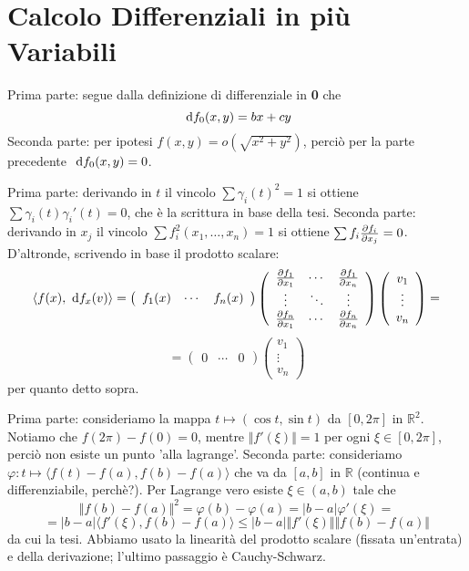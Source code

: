 \section{Calcolo Differenziali in più Variabili}

 Prima parte: segue dalla definizione di differenziale in {\bf 0} che
\[ \de{f}_0( x,y) = bx+cy \]
Seconda parte: per ipotesi $f(x,y) = o(\sqrt{x^2+y^2} )$, perciò per la parte precedente $\de{f}_0(x,y) = 0$.

 Prima parte: derivando in $t$ il vincolo $\sum \gamma_i(t)^2 =1$ si ottiene $\sum \gamma_i(t) \gamma_i'(t) = 0$, che è la scrittura in base della tesi. \newline
Seconda parte: derivando in $x_j$ il vincolo $\sum f_i^2(x_1, \ldots, x_n) = 1$ si ottiene $\sum f_i \dpar{f_i}{x_j} = 0$. D'altronde, scrivendo in base il prodotto scalare:
$$ \langle f(x), \de{f}_x(v) \rangle  = \left ( \begin{array}{ccc} f_1(x) & \cdots & f_n(x) \end{array} \right ) \left( \begin{array}{ccc} \dpar{f_1}{x_1} & \cdots & \dpar{f_1}{x_n} \\ \vdots & \ddots & \vdots \\ \dpar{f_n}{x_1} & \cdots & \dpar{f_n}{x_n} \end{array} \right)  \left ( \begin{array}{c} v_1 \\ \vdots \\ v_n \end{array} \right ) = $$
$$ = \left ( \begin{array}{ccc} 0 & \cdots & 0 \end{array} \right ) \left ( \begin{array}{c} v_1 \\ \vdots \\ v_n \end{array} \right ) $$
per quanto detto sopra.

 Prima parte: consideriamo la mappa $t \mapsto (\cos t, \sin t)$ da $[0,2 \pi]$ in $\mathbb{R}^2$. Notiamo che $ f(2 \pi ) - f(0) = 0$, mentre $\Vert f'(\xi) \Vert = 1$ per ogni $\xi \in [0, 2 \pi ]$, perciò non esiste un punto 'alla lagrange'. \newline
Seconda parte: consideriamo $\varphi : t \mapsto \langle f(t) - f(a), f(b) - f(a) \rangle $ che va da $[a,b]$ in $\mathbb{R}$ (continua e differenziabile, perchè?). Per Lagrange vero esiste $\xi \in (a,b)$ tale che 
$$ \Vert f(b) - f(a) \Vert ^2 = \varphi(b) - \varphi(a) = \vert b-a \vert \varphi'(\xi) = $$
$$ = \vert b-a \vert \langle f'(\xi), f(b) - f(a) \rangle \le \vert b-a \vert \Vert f'(\xi) \Vert \Vert f(b) - f(a) \Vert $$
da cui la tesi. Abbiamo usato la linearità del prodotto scalare (fissata un'entrata) e della derivazione; l'ultimo passaggio è Cauchy-Schwarz.

